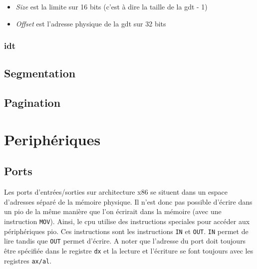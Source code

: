 \documentclass[a4paper]{article}
\begin{document}
\begin{itemize}[label=\textbullet]
	\item \textit{Size} est la limite sur 16 bits (c'est à dire la taille de la
    \acrshort{gdt} - 1)
	\item \textit{Offset} est l'adresse physique de la \acrshort{gdt} sur 32 bits
\end{itemize}

\subsubsection{\acrshort{idt}}


\subsection{Segmentation}


\subsection{Pagination}


\newpage

\section{Periphériques}
\subsection{Ports}
Les ports d'entrées/sorties sur architecture x86 se situent dans un espace d'adresses
séparé de la mémoire physique. Il n'est donc pas possible d'écrire dans un \acrshort{pio}
de la même manière que l'on écrirait dans la mémoire (avec une instruction 
\texttt{MOV}). Ainsi, le \acrshort{cpu} utilise des instructions speciales
pour accéder aux périphériques \acrshort{pio}. Ces instructions sont les instructions
\texttt{IN} et \texttt{OUT}. \texttt{IN} permet de lire
tandis que \texttt{OUT} permet d'écrire. A noter que l'adresse du port
doit toujours être spécifiée dans le registre \texttt{dx} et la lecture
et l'écriture se font toujours avec les registres \texttt{ax/al}.
\end{document}
